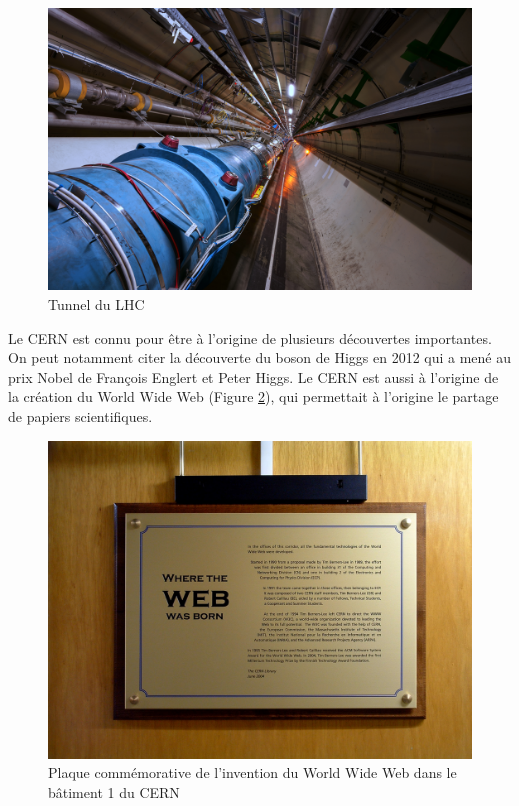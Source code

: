 \documentclass[a4paper,11pt]{report}
\begin{document}
\begin{figure}[!htb]
    \includegraphics[width=\textwidth, center]{LHC.jpg}
    \caption{Tunnel du LHC}
    \label{LHC}
\end{figure}

Le CERN est connu pour être à l'origine de plusieurs découvertes importantes.
On peut notamment citer la découverte du boson de Higgs en 2012 qui a mené au prix Nobel de François Englert et Peter Higgs.
Le CERN est aussi à l'origine de la création du World Wide Web (Figure \ref{WEB}), qui permettait à l'origine le partage de papiers scientifiques.

\begin{figure}[!htb]
    \includegraphics[width=\textwidth, center]{WEB.jpg}
    \caption{Plaque commémorative de l'invention du World Wide Web dans le bâtiment 1 du CERN}
    \label{WEB}
\end{figure}
\end{document}
